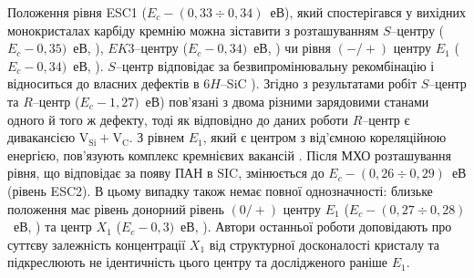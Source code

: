 \documentclass[a4paper,14pt,oneside,openany]{memoir}
\begin{document}
Положення рівня ESC1 ($E_c-(0,33\div0,34)$~еВ), який спостерігався у вихідних монокристалах карбіду кремнію
можна зіставити з розташуванням $S$--центру ($E_c-0,35)$~еВ, \cite{Lebed1999,Anikin1991:2,Anikin1991:3}),
$EK3$--центру ($E_c-0,34)$~еВ, \cite{Kuznets1997}) чи рівня $(-/+)$ центру $E_1$ ($E_c-0,34)$~еВ, \cite{Lebed1999}).
$S$--центр відповідає за безвипромінювальну рекомбінацію і відноситься до власних дефектів в 6$H$--SiC \cite{Lebed1999}).
Згідно з результатами робіт \cite{Anikin1991:2,Anikin1991:3} $S$--центр та $R$--центр ($E_c-1,27)$~еВ) пов'язані
з двома різними зарядовими станами одного й того ж дефекту, тоді як відповідно до даних роботи \cite{Lebedev2000}
$R$--центр є дивакансією V$_\text{Si}+$V$_\text{C}$.
З рівнем $E_1$, який є центром з від'ємною кореляційною енергією,
пов'язують комплекс кремнієвих вакансій  \cite{Lebedev2001}.
Після МХО розташування рівня, що відповідає за появу ПАН в SIC, змінюється до $E_c-(0,26\div0,29)$~еВ (рівень ESC2).
В цьому випадку також немає повної однозначності:
близьке положення має рівень донорний рівень $(0/+)$ центру $E_1$ ($E_c-(0,27\div0,28)$~еВ, \cite{Hemmingsson})
та центр $X_1$ ($E_c-0,3)$~еВ, \cite{Lebedev2001}).
Автори останньої роботи доповідають про суттєву залежність концентрації $X_1$ від структурної
досконалості кристалу та підкреслюють не ідентичність цього центру  та  дослідженого раніше $E_1$.
\end{document}
